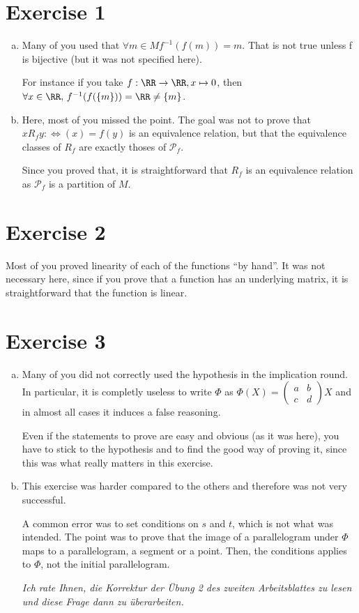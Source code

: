 \section{Exercise 1}

\begin{enumerate}[a)]
 \item Many of you used that $\forall m\in M f^{-1}(f(m))=m$. That is not true unless f is bijective (but it was not specified here).
 
 For instance if you take $f:\RR\to\RR,x\mapsto 0$, then $\forall x\in\RR,\, f^{-1}(f(\{m\}))=\RR\neq \{m\}$.
 
 \item Here, most of you missed the point. The goal was not to prove that $xR_f y:\iff(x)=f(y)$ is an equivalence relation, but that the equivalence classes of $R_f$ are exactly thoses of $\mathcal{P}_f$.
 
 Since you proved that, it is straightforward that $R_f$ is an equivalence relation as $\mathcal{P}_f$ is a partition of $M$.
\end{enumerate}

\section{Exercise 2}

 Most of you proved linearity of each of the functions ``by hand''. It was not necessary here, since if you prove that a function has an underlying matrix, it is straightforward that the function is linear.

\section{Exercise 3}

\begin{enumerate}[a)]
 \item Many of you did not correctly used the hypothesis in the implication round. In particular, it is completly useless to write $\Phi$ as $\Phi(X)=\begin{pmatrix}a & b\\c & d\end{pmatrix}X$ and in almost all cases it induces a false reasoning.

 Even if the statements to prove are easy and obvious (as it was here), you have to stick to the hypothesis and to find the good way of proving it, since this was what really matters in this exercise.
 
 \item This exercise was harder compared to the others and therefore was not very successful.
 
 A common error was to set conditions on $s$ and $t$, which is not what was intended. The point was to prove that the image of a parallelogram under $\Phi$ maps to a parallelogram, a segment or a point.
 Then, the conditions applies to $\Phi$, not the initial parallelogram.
 
 \textit{Ich rate Ihnen, die Korrektur der Übung 2 des zweiten Arbeitsblattes zu lesen und diese Frage dann zu überarbeiten.}
\end{enumerate}


